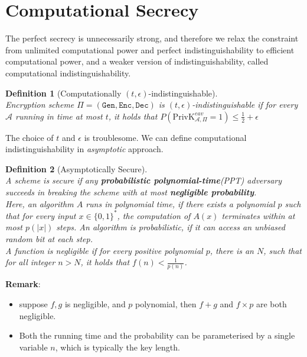 \documentclass[12pt]{article}
\newcommand\PrivK{\mathrm{PrivK}}
\newtheorem{definition}{Definition}[section]
\theoremstyle{definition}
\begin{document}
\section{Computational Secrecy}
The perfect secrecy is unnecessarily strong, and therefore we relax the constraint from unlimited computational power and perfect indistinguishability to efficient computational power, and a weaker version of indistinguishability, called computational indistinguishability.
\begin{definition}[Computationally {$(t,\epsilon)$}-indistinguishable]
\hfill\\\normalfont Encryption scheme $\Pi=(\texttt{Gen},\texttt{Enc},\texttt{Dec})$ is $(t,\epsilon)$-indistinguishable if for every $\mathcal{A}$ running in time at most $t$, it holds that
$
P(\PrivK _{\mathcal{A},\Pi}^{eav} = 1) \leq \frac{1}{2}+\epsilon
$
\end{definition}
The choice of $t$ and $\epsilon$ is troublesome. We can define computational indistinguishability in \textit{asymptotic} approach.
\begin{definition}[Asymptotically Secure]
\hfill\\\normalfont A scheme is secure if any \textbf{probabilistic polynomial-time}(PPT) adversary succeeds in breaking the scheme with at most \textbf{negligible probability}.\\
Here, an algorithm $A$ runs in polynomial time, if there exists a polynomial $p$ such that for every input $x\in \{0,1\}^\ast$, the computation of $A(x)$ terminates within at most $p(|x|)$ steps. An algorithm is probabilistic, if it can access an unbiased random bit at each step.\\
A function is negligible if for every positive polynomial $p$, there is an $N$, such that for all integer $n>N$, it holds that $f(n)<\frac{1}{p(n)}$.
\end{definition}
\textbf{Remark}: 
\begin{itemize} 
  \item suppose $f,g$ is negligible, and $p$ polynomial, then $f+g$ and $f\times p$ are both negligible.
  \item Both the running time and the probability can be parameterised by a single variable $n$, which is typically the key length.
\end{itemize}
\end{document}

